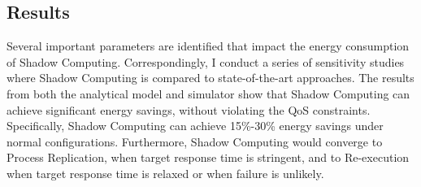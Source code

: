 \subsection{Results}
Several important parameters are identified that impact the energy consumption of Shadow Computing. Correspondingly, I conduct a series of sensitivity studies where Shadow Computing is compared to state-of-the-art approaches. %
The results from both the analytical model and simulator show that Shadow Computing can achieve significant energy savings, without violating the QoS constraints. %
Specifically, Shadow Computing can achieve 15\%-30\% energy savings under normal configurations. Furthermore, Shadow Computing would converge to Process Replication, when target response time is stringent, and to Re-execution when target response time is relaxed or when failure is unlikely.%




